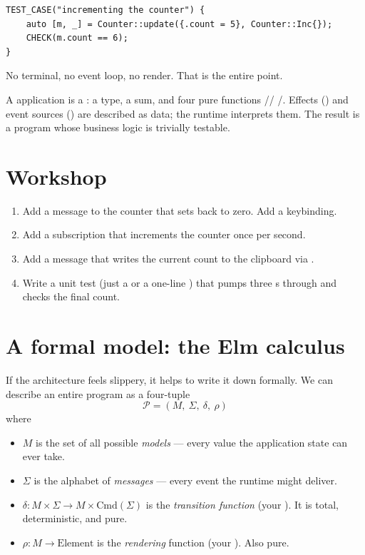 \begin{lstlisting}
TEST_CASE("incrementing the counter") {
    auto [m, _] = Counter::update({.count = 5}, Counter::Inc{});
    CHECK(m.count == 6);
}
\end{lstlisting}

No terminal, no event loop, no render. That is the entire point.

\begin{recap}
A \maya{} application is a : a  type, a
 sum, and four pure functions //
/. Effects () and event sources
() are described as data; the runtime interprets them. The
result is a program whose business logic is trivially testable.
\end{recap}

\section*{Workshop}

\begin{enumerate}[leftmargin=*]
  \item Add a  message to the counter that sets
     back to zero. Add a  keybinding.
  \item Add a  subscription that increments the counter
    once per second.
  \item Add a  message that writes the current count to
    the clipboard via .
  \item Write a unit test (just a  or a
    one-line ) that pumps three s through
     and checks the final count.
\end{enumerate}

\section{A formal model: the Elm calculus}

If the architecture feels slippery, it helps to write it down
formally. We can describe an entire \maya{} program as a four-tuple
\[
  \mathcal{P} = (M,\ \Sigma,\ \delta,\ \rho)
\]
where
\begin{itemize}[leftmargin=*]
  \item $M$ is the set of all possible \emph{models} --- every
    value the application state can ever take.
  \item $\Sigma$ is the alphabet of \emph{messages} --- every
    event the runtime might deliver.
  \item $\delta : M \times \Sigma \to M \times \mathrm{Cmd}(\Sigma)$
    is the \emph{transition function} (your ).
    It is total, deterministic, and pure.
  \item $\rho : M \to \mathrm{Element}$ is the \emph{rendering}
    function (your ). Also pure.
\end{itemize}

